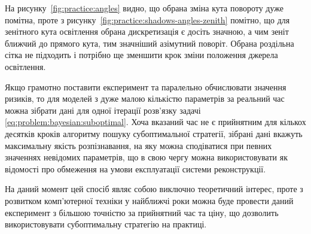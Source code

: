 На рисунку~\ref{fig:practice:angles} видно,
що обрана зміна кута повороту дуже помітна,
проте з рисунку~\ref{fig:practice:shadows-angles-zenith} помітно,
що для зенітного кута освітлення
обрана дискретизація є досіть значною,
а чим зеніт ближчий до прямого кута,
тим значніший азімутний поворіт.
Обрана роздільна сітка не підходить
і потрібно ще зменшити крок зміни положення джерела освітлення.

Якщо грамотно поставити експеримент та паралельно обчислювати значення ризиків,
то для моделей з дуже малою кількістю параметрів за реальний час можна зібрати дані
для одної ітерації розв'язку задачі \eqref{eq:problem:bayesian:suboptimal}.
Хоча вказаний час не є прийнятним для кількох десятків кроків
алгоритму пошуку субоптимальної стратегії,
зібрані дані вкажуть максимальну якість розпізнавання,
на яку можна сподіватися при певних значеннях невідомих параметрів,
що в свою чергу можна використовувати як
відомості про обмеження на умови експлуатації системи реконструкції.

На даний момент цей спосіб являє собою виключно теоретичний інтерес,
проте з розвитком комп'ютерної техніки у найближчі роки можна буде
провести даний експеримент з більшою точністю за прийнятний час та ціну,
що дозволить використовувати субоптимальну стратегію на практиці.
